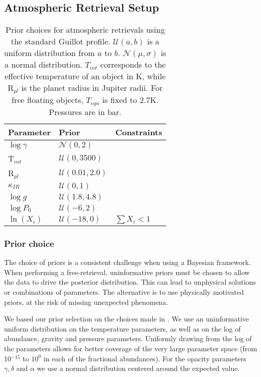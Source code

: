 \subsection{Atmospheric Retrieval Setup}
\begin{table}[t]
	\centering
	\begin{tabular}{lll}
		\toprule
		\textbf{Parameter} & \textbf{Prior} & \textbf{Constraints}\\
		\midrule
		$\log\gamma$ & $\mathcal{N}(0,2)$&\\
		T$_{int}$ & $\mathcal{U}(0,3500)$&\\
		R$_{pl}$ & $\mathcal{U}(0.01,2.0)$&\\
		$\kappa_{IR}$ & $\mathcal{U}(0,1)$&\\
		$\log g$ & $\mathcal{U}(1.8,4.8)$&\\
		$\log P_{0}$ & $\mathcal{U}(-6,2)$&\\
		$\ln(X_{i})$ & $\mathcal{U}(-18,0)$ & $\sum X_{i} < 1$\\
		\bottomrule		
	\end{tabular}
	\caption{Prior choices for atmospheric retrievals using the standard Guillot profile. $\mathcal{U}(a,b)$ is a uniform distribution from $a$ to $b$. $\mathcal{N}(\mu,\sigma)$ is a normal distribution. $T_{int}$ corresponds to the effective temperature of an object in K, while R$_{pl}$ is the planet radius in Jupiter radii. For free floating objects, $T_{equ}$ is fixed to 2.7K. Pressures are in bar.}
	\label{tab:priors}
\end{table}

\subsubsection{Prior choice}
The choice of priors is a consistent challenge when using a Bayesian framework.
When performing a free-retrieval, uninformative priors must be chosen to allow the data to drive the posterior distribution.
This can lead to unphysical solutions or combinations of parameters.
The alternative is to use physically motivated priors, at the risk of missing unexpected phenomena.

We based our prior selection on the choices made in \parencite{Molliere2019}.
We use an uninformative uniform distribution on the temperature parameters, as well as on the log of abundance, gravity and pressure parameters.
Uniformly drawing from the log of the parameters allows for better coverage of the very large parameter space (from 10$^{-15}$ to $10^{0}$ in each of the fractional abundances).
For the opacity parameters $\gamma,\delta$ and $\alpha$ we use a normal distribution centered around the expected value. 


